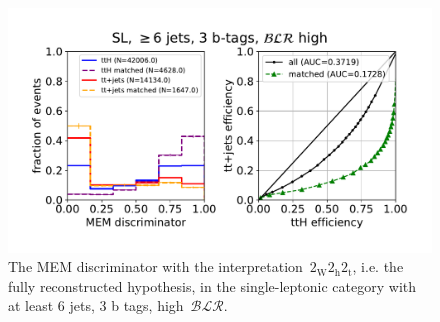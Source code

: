 \begin{figure}
\begin{centering}
\includegraphics[width = 1.0\textwidth]{figures/mem_sl_jge6_t3_blrH.pdf}
\caption[The MEM discriminator with the interpretation~$2_{\mathrm{W}} 2_{\mathrm{h}} 2_{\mathrm{t}}$ in the $\ge6$ jets, 3~b tags, high~$\mathcal{BLR}$ category]{The MEM discriminator with the interpretation~$2_{\mathrm{W}} 2_{\mathrm{h}} 2_{\mathrm{t}}$, i.e. the fully reconstructed hypothesis, in the single-leptonic category with at least 6 jets, 3 b tags, high~$\mathcal{BLR}$.}
\label{fig:mem_sl_jge6_t3}
\end{centering}
\end{figure}

